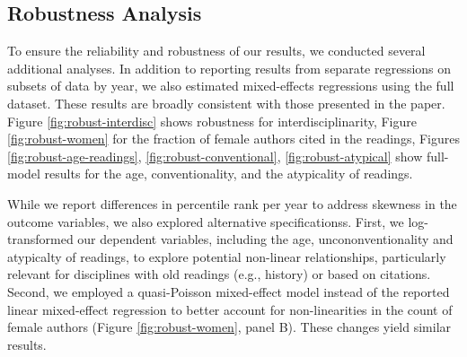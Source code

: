 \documentclass[
  british,
  12pt, %
]{article}
\begin{document}
\subsection{Robustness Analysis}\label{robustness-analysis}

To ensure the reliability and robustness of our results, we conducted several additional analyses. In addition to reporting results from separate regressions on subsets of data by year, we also estimated mixed-effects regressions using the full dataset. These results are broadly consistent with those presented in the paper. Figure \ref{fig:robust-interdisc} shows robustness for interdisciplinarity, Figure \ref{fig:robust-women} for the fraction of female authors cited in the readings, Figures \ref{fig:robust-age-readings}, \ref{fig:robust-conventional}, \ref{fig:robust-atypical} show full-model results for the age, conventionality, and the atypicality of readings.

While we report differences in percentile rank per year to address skewness in the outcome variables, we also explored alternative specificationss. First, we log-transformed our dependent variables, including the age, uncononventionality and atypicalty of readings, to explore potential non-linear relationships, particularly relevant for disciplines with old readings (e.g., history) or based on citations. Second, we employed a quasi-Poisson mixed-effect model instead of the reported linear mixed-effect regression to better account for non-linearities in the count of female authors (Figure \ref{fig:robust-women}, panel B). These changes yield similar results.
\end{document}
